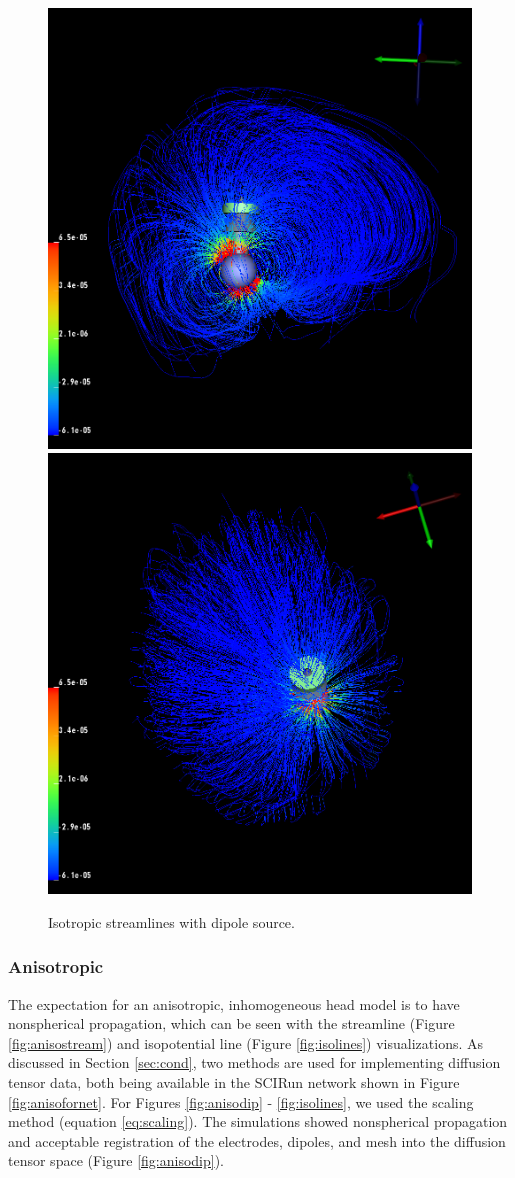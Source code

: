 \begin{figure}[H]
\begin{center}
\includegraphics[width=.49\textwidth]{Figures/iso_streamlines}
\includegraphics[width=.49\textwidth]{Figures/iso_streamlines_top}
\caption{Isotropic streamlines with dipole source.}
\label{fig:isostream}
\end{center}
\end{figure}

\subsubsection{Anisotropic}

The expectation for an anisotropic, inhomogeneous head model is to have nonspherical propagation, which can be seen with the streamline (Figure \ref{fig:anisostream}) and isopotential line (Figure \ref{fig:isolines}) visualizations. As discussed in Section \ref{sec:cond}, two methods are used for implementing diffusion tensor data, both being available in the SCIRun network shown in Figure \ref{fig:anisofornet}. For Figures \ref{fig:anisodip} - \ref{fig:isolines}, we used the scaling method (equation \ref{eq:scaling}). The simulations showed nonspherical propagation and acceptable registration of the electrodes, dipoles, and mesh into the diffusion tensor space (Figure \ref{fig:anisodip}).

